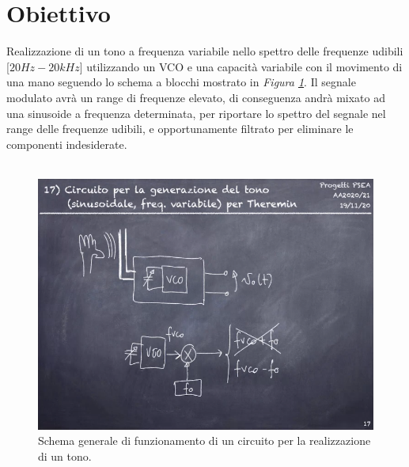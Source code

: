 \documentclass[titlepage]{report}
\begin{document}
	

\begin{frontespizio}
\end{frontespizio}
	
\tableofcontents

\chapter*{Obiettivo}
	\label{ch:Scope}
	\large Realizzazione di un tono a frequenza variabile nello spettro delle frequenze udibili [$20Hz - 20kHz$] utilizzando un VCO e una capacità variabile con il movimento di una mano seguendo lo schema a blocchi mostrato in \textit{Figura \ref{fig:Schema_Assegnazione}}. Il segnale modulato avrà un range di frequenze elevato, di conseguenza andrà mixato ad una sinusoide a frequenza determinata, per riportare lo spettro del segnale nel range delle frequenze udibili, e opportunamente filtrato per eliminare le componenti indesiderate.
	\\
	\\
	\begin{figure}[h]
		\centering
		\includegraphics[scale=0.5]{Immagini/Schema_progetto_17.png}
		\caption{Schema generale di funzionamento di un circuito per la realizzazione di un tono.}
		\label{fig:Schema_Assegnazione}
	\end{figure}
\end{document}
